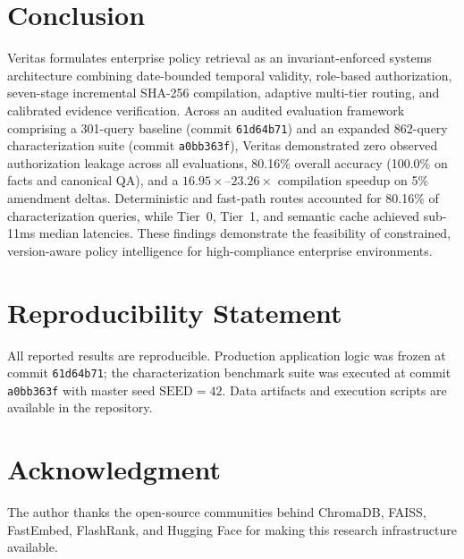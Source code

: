 \documentclass[journal]{IEEEtran}
\newcommand{\sys}{Veritas}
\begin{document}
\section{Conclusion}
\sys{} formulates enterprise policy retrieval as an invariant-enforced systems architecture combining date-bounded temporal validity, role-based authorization, seven-stage incremental SHA-256 compilation, adaptive multi-tier routing, and calibrated evidence verification. Across an audited evaluation framework comprising a 301-query baseline (commit \texttt{61d64b71}) and an expanded 862-query characterization suite (commit \texttt{a0bb363f}), \sys{} demonstrated zero observed authorization leakage across all evaluations, 80.16\% overall accuracy (100.0\% on facts and canonical QA), and a $16.95\times$--$23.26\times$ compilation speedup on 5\% amendment deltas. Deterministic and fast-path routes accounted for 80.16\% of characterization queries, while Tier~0, Tier~1, and semantic cache achieved sub-11ms median latencies. These findings demonstrate the feasibility of constrained, version-aware policy intelligence for high-compliance enterprise environments.

\section*{Reproducibility Statement}
All reported results are reproducible. Production application logic was frozen at commit \texttt{61d64b71}; the characterization benchmark suite was executed at commit \texttt{a0bb363f} with master seed $\text{SEED}=42$. Data artifacts and execution scripts are available in the repository.

\section*{Acknowledgment}
The author thanks the open-source communities behind ChromaDB, FAISS, FastEmbed, FlashRank, and Hugging Face for making this research infrastructure available.
\end{document}
